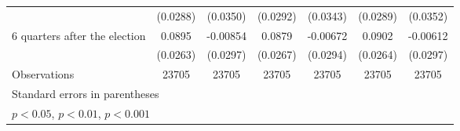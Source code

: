 \begin{table}[htbp]
\begin{tabular}{l*{6}{c}}
                    &    (0.0288)         &    (0.0350)         &    (0.0292)         &    (0.0343)         &    (0.0289)         &    (0.0352)         \\
[1em]
 6 quarters after the election&      0.0895\sym{***}&    -0.00854         &      0.0879\sym{***}&    -0.00672         &      0.0902\sym{***}&    -0.00612         \\
                    &    (0.0263)         &    (0.0297)         &    (0.0267)         &    (0.0294)         &    (0.0264)         &    (0.0297)         \\
\hline
Observations        &       23705         &       23705         &       23705         &       23705         &       23705         &       23705         \\
\hline\hline
\multicolumn{7}{l}{\footnotesize Standard errors in parentheses}\\
\multicolumn{7}{l}{\footnotesize \sym{*} \(p<0.05\), \sym{**} \(p<0.01\), \sym{***} \(p<0.001\)}\\
\end{tabular}
\end{table}
